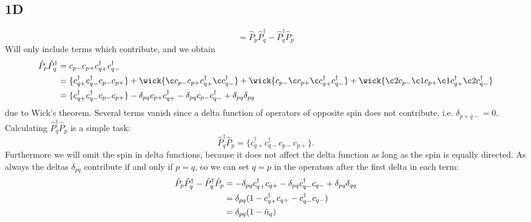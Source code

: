 \documentclass[norsk,a4paper,12pt]{article}
\begin{document}
\subsection*{1D}
\begin{equation*}
[\hat{P}_p,\hat{P}_q^{\dagger}]=\hat{P}_p\hat{P}_q^{\dagger}-\hat{P}_q^{\dagger}\hat{P}_p
\end{equation*}
Will only include terms which contribute, and we obtain
\begin{align*}
\hat{P}_p\hat{P}_q^{\dagger}
&=c_{p-}c_{p+}c_{q+}^{\dagger}c_{q-}^{\dagger}\notag\\
&=\{c_{q+}^{\dagger}c_{q-}^{\dagger}c_{p-}c_{p+}\}+\wick{\c c_{p-}c_{p+}c_{q+}^{\dagger}\c c_{q-}^{\dagger}}+\wick{c_{p-}\c c_{p+}\c c_{q+}^{\dagger}c_{q-}^{\dagger}}+\wick{\c2 c_{p-}\c1 c_{p+}\c1 c_{q+}^{\dagger}\c2 c_{q-}^{\dagger}}\notag\\
&=\{c_{q+}^{\dagger}c_{q-}^{\dagger}c_{p-}c_{p+}\}-\delta_{pq}c_{p+}c_{q+}^{\dagger}-\delta_{pq}c_{p-}c_{q-}^{\dagger}+\delta_{pq}\delta_{pq}
\end{align*}
due to Wick's theorem. Several terms vanish since a delta function of operators of opposite spin does not contribute, i.e. $\delta_{p+q-}=0$. Calculating $\hat{P}_q^{\dagger}\hat{P}_p$ is a simple task:
\begin{equation*}
\hat{P}_q^{\dagger}\hat{P}_p=\{c_{q+}^{\dagger}c_{q-}^{\dagger}c_{p-}c_{p+}\}.
\end{equation*}
Furthermore we will omit the spin in delta functions, because it does not affect the delta function as long as the spin is equally directed. As always the deltas $\delta_{pq}$ contribute if and only if $p=q$, so we can set $q=p$ in the operators after the first delta in each term:
\begin{align}
\hat{P}_p\hat{P}_q^{\dagger}-\hat{P}_q^{\dagger}\hat{P}_p&=-\delta_{pq}c_{q+}^{\dagger}c_{q+}-\delta_{pq}c_{q-}^{\dagger}c_{q-}+\delta_{pq}\delta_{qq}\notag\\
&=\delta_{pq}(1-c_{q+}^{\dagger}c_{q+}-c_{q-}^{\dagger}c_{q-})\notag\\
&=\delta_{pq}(1-\hat{n}_q)\label{eq:ex1d}
\end{align}
\end{document}
